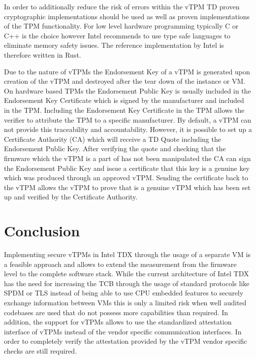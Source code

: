 \documentclass[sigplan,screen,nonacm]{acmart}
\begin{document}
In order to additionally reduce the risk of errors within the vTPM TD proven cryptographic implementations should be used as well as proven implementations of the TPM functionality.
For low level hardware programming typically C or C++ is the choice however Intel recommends to use type safe languages to eliminate memory safety issues\cite[p. 20]{Intel-vTPM}.
The reference implementation by Intel is therefore written in Rust\cite[p. 20]{Intel-vTPM}.

Due to the nature of vTPMs the Endorsement Key of a vTPM is generated upon creation of the vTPM and destroyed after the tear down of the instance or VM.
On hardware based TPMs the Endorsement Public Key is usually included in the Endorsement Key Certificate which is signed by the manufacturer and included in the TPM.
Including the Endorsement Key Certificate in the TPM allows the verifier to attribute the TPM to a specific manufacturer.
By default, a vTPM can not provide this traceability and accountability.
However, it is possible to set up a Certificate Authority (CA) which will receive a TD Quote including the Endorsement Public Key.
After verifying the quote and checking that the firmware which the vTPM is a part of has not been manipulated the CA can sign the Endorsement Public Key and issue a certificate that this key is a genuine key which was produced through an approved vTPM.
Sending the certificate back to the vTPM allows the vTPM to prove that is a genuine vTPM which has been set up and verified by the Certificate Authority.

\section{Conclusion}
Implementing secure vTPMs in Intel TDX through the usage of a separate VM is a feasible approach and allows to extend the measurement from the firmware level to the complete software stack.
While the current architecture of Intel TDX has the need for increasing the TCB through the usage of standard protocols like SPDM or TLS instead of being able to use CPU embedded features to securely exchange information between VMs this is only a limited risk when well audited codebases are used that do not possess more capabilities than required.
In addition, the support for vTPMs allows to use the standardized attestation interface of vTPMs instead of the vendor specific communication interfaces.
In order to completely verify the attestation provided by the vTPM vendor specific checks are still required.



\end{document}
